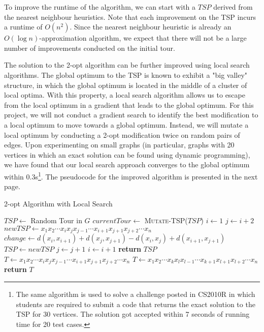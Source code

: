 \documentclass[paper=a4, fontsize=11pt]{scrartcl}	%
\numberwithin{equation}{section}		%
\numberwithin{figure}{section}			%
\numberwithin{table}{section}				%
\begin{document}
To improve the runtime of the algorithm, we can start with a $TSP$ derived from the nearest neighbour heuristics. Note that each improvement on the TSP incurs a runtime of $O(n^2)$. Since the nearest neighbour heuristic is already an $O(\log n)$-approximation algorithm, we expect that there will not be a large number of improvements conducted on the initial tour.

The solution to the 2-opt algorithm can be further improved using local search algorithms. The global optimum to the TSP is known to exhibit a "big valley" structure, in which the global optimum is located in the middle of a cluster of local optima.\cite{boese} With this property, a local search algorithm allows us to escape from the local optimum in a gradient that leads to the global optimum. For this project, we will not conduct a gradient search to identify the best modification to a local optimum to move towards a global optimum. Instead, we will mutate a local optimum by conducting a 2-opt modification twice on random pairs of edges. Upon experimenting on small graphs (in particular, graphs with 20 vertices in which an exact solution can be found using dynamic programming), we have found that our local search approach converges to the global optimum within 0.3s\footnote{The same algorithm is used to solve a challenge posted in CS2010R in which students are required to submit a code that returns the exact solution to the TSP for 30 vertices. The solution got accepted within 7 seconds of running time for 20 test cases.}. The pseudocode for the improved algorithm is presented in the next page.

\begin{algorithm}
\caption{2-opt Algorithm with Local Search}\label{2-opt-local}
\begin{algorithmic}[1]
   \State $TSP \gets $ Random Tour in $G$
   	\State $currentTour \gets$ \textsc{Mutate-TSP}($TSP$)
	\State  $i \gets 1$
	\State  $j \gets i+2$
         \State $newTSP \gets x_1x_2 \cdots x_ix_jx_{j-1} \cdots x_{i+1}x_{j+1}x_{j+2} \cdots x_n$ 
         \State $change \gets  d(x_i, x_{i+1})+d(x_j, x_{j+1}) - d(x_i, x_j) + d(x_{i+1}, x_{j+1})$
         	\State $TSP \gets newTSP$
         \EndIf
         \State $j \gets j+1$
         \EndWhile
\State      $i \gets i+1$
	  \EndWhile
   \EndWhile
   \State \textbf{return} $TSP$
\EndProcedure
\\
 
   \State $T \gets x_1x_2 \cdots x_ix_jx_{j-1} \cdots x_{i+1}x_{j+1}x_{j+2} \cdots x_n$
   \State $T \gets x_1x_2 \cdots x_kx_lx_{l-1} \cdots x_{k+1}x_{l+1}x_{l+2} \cdots x_n$
   \State \textbf{return} $T$
\EndProcedure
\end{algorithmic}
\end{algorithm}
\end{document}
